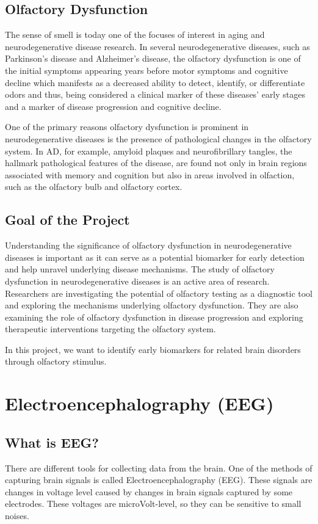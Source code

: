 \documentclass[12pt]{article}
\begin{document}
\subsection{Olfactory Dysfunction}
The sense of smell is today one of the focuses of interest in aging and neurodegenerative disease research. In several neurodegenerative diseases, such as Parkinson's disease and Alzheimer's disease, the olfactory dysfunction is one of the initial symptoms appearing years before motor symptoms and cognitive decline which manifests as a decreased ability to detect, identify, or differentiate odors and thus, being considered a clinical marker of these diseases' early stages and a marker of disease progression and cognitive decline. \cite{ref-olfactory} \par
One of the primary reasons olfactory dysfunction is prominent in neurodegenerative diseases is the presence of pathological changes in the olfactory system. In AD, for example, amyloid plaques and neurofibrillary tangles, the hallmark pathological features of the disease, are found not only in brain regions associated with memory and cognition but also in areas involved in olfaction, such as the olfactory bulb and olfactory cortex.

\subsection{Goal of the Project}
Understanding the significance of olfactory dysfunction in neurodegenerative diseases is important as it can serve as a potential biomarker for early detection and help unravel underlying disease mechanisms.
The study of olfactory dysfunction in neurodegenerative diseases is an active area of research. Researchers are investigating the potential of olfactory testing as a diagnostic tool and exploring the mechanisms underlying olfactory dysfunction. They are also examining the role of olfactory dysfunction in disease progression and exploring therapeutic interventions targeting the olfactory system. \par
In this project, we want to identify early biomarkers for related brain disorders through olfactory stimulus.
\newpage

\section{Electroencephalography (EEG)}
\subsection{What is EEG?}
There are different tools for collecting data from the brain. One of the methods of capturing brain signals is called Electroencephalography (EEG). These signals are changes in voltage level caused by changes in brain signals captured by some electrodes. These voltages are microVolt-level, so they can be sensitive to small noises. \par
\end{document}

